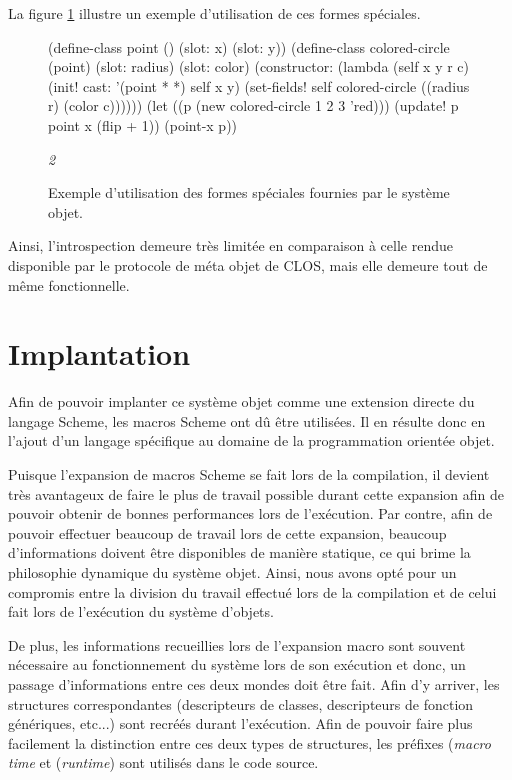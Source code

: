 \documentclass[12pt,oneside,letterpaper,francais]{book}
\newcommand{\scheme}[1]{\selectlanguage{english}{\tt #1}\selectlanguage{french}}
\newcommand{\schemeresult}[1]{{\it #1}}
\begin{document}
La figure \ref{OO:specform} illustre un exemple d'utilisation de ces
formes spéciales.

\begin{figure}[htb!]
  \begin{schemecode}
(define-class point () (slot: x) (slot: y))
(define-class colored-circle (point) (slot: radius) (slot: color)
  (constructor:
   (lambda (self x y r c)
     (init! cast: '(point * *) self x y)
     (set-fields! self colored-circle ((radius r) (color c))))))
(let ((p (new colored-circle 1 2 3 'red)))
  (update! p point x (flip + 1))
  (point-x p))
  \end{schemecode}
  \schemeresult{2}
  \caption{Exemple d'utilisation des formes spéciales fournies par le
    système objet.}
  \label{OO:specform}
\end{figure}

Ainsi, l'introspection demeure très limitée en comparaison à celle
rendue disponible par le protocole de méta objet de CLOS, mais elle
demeure tout de même fonctionnelle.


\section{Implantation}

Afin de pouvoir implanter ce système objet comme une extension directe
du langage Scheme, les macros Scheme ont dû être utilisées. Il en
résulte donc en l'ajout d'un langage spécifique au domaine de la
programmation orientée objet.

Puisque l'expansion de macros Scheme se fait lors de la compilation,
il devient très avantageux de faire le plus de travail possible durant
cette expansion afin de pouvoir obtenir de bonnes performances lors de
l'exécution. Par contre, afin de pouvoir effectuer beaucoup de travail
lors de cette expansion, beaucoup d'informations doivent être
disponibles de manière statique, ce qui brime la philosophie dynamique
du système objet. Ainsi, nous avons opté pour un compromis entre la
division du travail effectué lors de la compilation et de celui fait
lors de l'exécution du système d'objets.

De plus, les informations recueillies lors de l'expansion macro sont
souvent nécessaire au fonctionnement du système lors de son exécution
et donc, un passage d'informations entre ces deux mondes doit être
fait. Afin d'y arriver, les structures correspondantes (descripteurs
de classes, descripteurs de fonction génériques, etc...) sont recréés
durant l'exécution. Afin de pouvoir faire plus facilement la
distinction entre ces deux types de structures, les préfixes
\scheme{mt} (\textit{macro time} et \scheme{rt} (\textit{runtime})
sont utilisés dans le code source.
\end{document}
